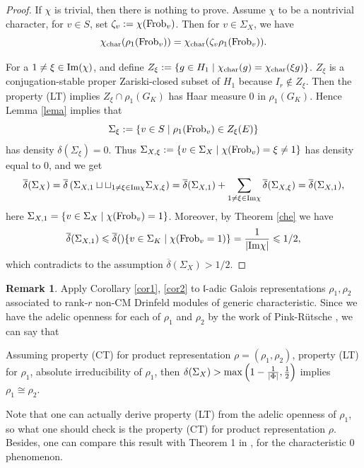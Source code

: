 \documentclass[20pt, oneside]{article}   	%
\theoremstyle{definition}
\newtheorem{rem}[thm]{Remark}
\newcommand{\fl}{\mathfrak{l}}
\begin{document}
\begin{proof}

If $\chi$ is trivial, then there is nothing to prove. Assume $\chi$ to be a nontrivial character, for $v\in S$, set $\zeta_v:=\chi({\rm Frob}_v)$. Then for $v\in \Sigma_X$, we have $$\chi_{\rm char}(\rho_1({\rm Frob}_v))=\chi_{\rm char}(\zeta_v\rho_1({\rm Frob}_v)).$$

For a  $1\not=\xi\in{\rm Im}(\chi)$, and define $Z_\xi:=\left\{g\in H_1\mid \chi_{\rm char}(g)=\chi_{\rm char}(\xi g)\right\}$. $Z_\xi$ is a conjugation-stable proper Zariski-closed subset of $H_1$ because $I_r\not\in Z_\xi$. Then the property (LT) implies $Z_\xi\cap \rho_1(G_K)$ has Haar measure 0 in $\rho_1(G_K)$. Hence Lemma \ref{lema} implies that $$\Sigma_\xi:=\{v\in S\mid \rho_1({\rm Frob}_v)\in Z_\xi(E)\}$$ has density $\delta(\Sigma_\xi)=0$.  Thus $\Sigma_{X,\xi}:=\{v\in \Sigma_X\mid \chi({\rm Frob}_v)=\xi\neq1\}$ has density equal to $0$, and we get $$\overline{\delta}(\Sigma_X)=\overline{\delta}\left(\Sigma_{X,1}\sqcup\sqcup_{1\neq\xi\in {\rm Im}\chi}\Sigma_{X,\xi}\right)=\overline{\delta}(\Sigma_{X,1})+\sum_{1\neq\xi\in{\rm Im}\chi}\overline{\delta}(\Sigma_{X,\xi})=\overline{\delta}(\Sigma_{X,1}),$$ 
here $\Sigma_{X,1}=\{v\in \Sigma_X\mid \chi({\rm Frob}_v)=1\}$. Moreover, by Theorem \ref{che} we have
$$\overline{\delta}(\Sigma_{X,1})\leqslant\overline{\delta}()\{v\in\Sigma_K\mid \chi({\rm Frob}_v=1)\}=\frac{1}{|{\rm Im}\chi|}\leqslant1/2,$$
which contradicts to the assumption $\overline{\delta}(\Sigma_X)>1/2$.


\end{proof}
\begin{rem}\label{rem2}
Apply Corollary \ref{cor1}, \ref{cor2} to $\fl$-adic Galois representations $\rho_1, \rho_2$ associated to rank-$r$ non-CM Drinfeld modules of generic characteristic. Since we have the adelic openness for each of $\rho_1$ and $\rho_2$ by the work of Pink-R\"utsche \cite{PR09}, we can say that
\begin{center}
Assuming property (CT) for product representation $\rho=(\rho_1,\rho_2)$, property (LT) for $\rho_1$, absolute irreducibility of $\rho_1$, then ${\delta}(\Sigma_X)> {\rm max}\left(1-\frac{1}{|\Phi|},\frac{1}{2}\right)$ implies $\rho_1\cong\rho_2$.
\end{center}

Note that one can actually derive property (LT) from the adelic openness of $\rho_1$, so what one should check is the property (CT) for product representation $\rho$. Besides, one can compare this result with Theorem 1 in \cite{Ra98} , for the characteristic $0$ phenomenon.  
\end{rem}
\end{document}
